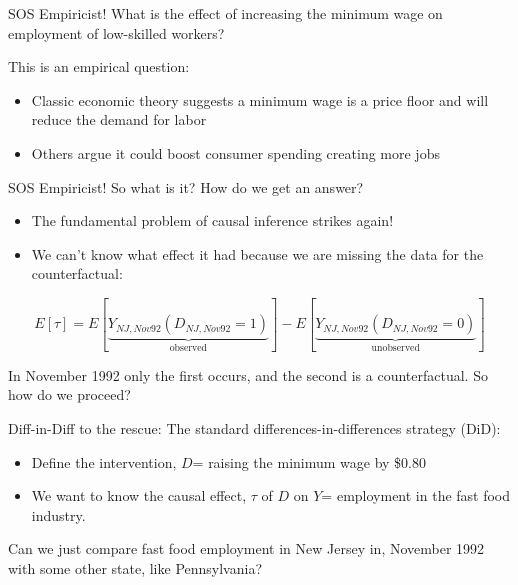 \documentclass[
  ignorenonframetext,
]{beamer}
\begin{document}
\begin{frame}{SOS Empiricist!}
\protect\hypertarget{sos-empiricist}{}
What is the effect of increasing the minimum wage on employment of
low-skilled workers?

This is an empirical question:

\begin{itemize}
\item
  Classic economic theory suggests a minimum wage is a price floor and
  will reduce the demand for labor
\item
  Others argue it could boost consumer spending creating more jobs
\end{itemize}
\end{frame}

\begin{frame}{SOS Empiricist!}
\protect\hypertarget{sos-empiricist-1}{}
So what is it? How do we get an answer?

\begin{itemize}
\item
  The fundamental problem of causal inference strikes again!
\item
  We can't know what effect it had because we are missing the data for
  the counterfactual:
\end{itemize}

\[
E[\tau]=E[\underbrace{Y_{NJ,Nov92}(D_{NJ,Nov92}=1)}_\text{observed}]-E[\underbrace{Y_{NJ,Nov92}(D_{NJ,Nov92}=0)}_\text{unobserved}]
\]

In November 1992 only the first occurs, and the second is a
counterfactual. So how do we proceed?
\end{frame}

\begin{frame}{Diff-in-Diff to the rescue:}
\protect\hypertarget{diff-in-diff-to-the-rescue}{}
The standard differences-in-differences strategy (DiD):

\begin{itemize}
\item
  Define the intervention, \(D\)= raising the minimum wage by \$0.80
\item
  We want to know the causal effect, \(\tau\) of \(D\) on \(Y\)=
  employment in the fast food industry.
\end{itemize}

Can we just compare fast food employment in New Jersey in, November 1992
with some other state, like Pennsylvania?
\end{frame}
\end{document}
